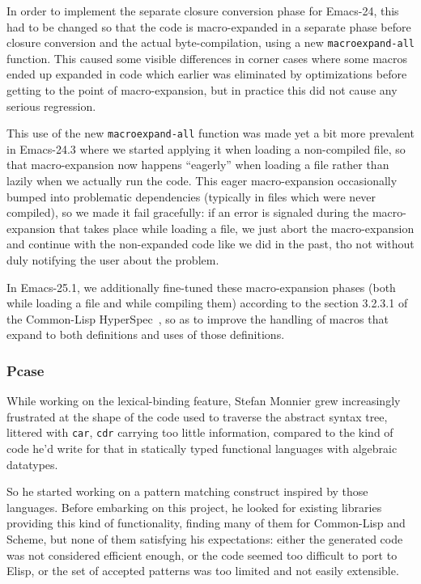 \documentclass[format=acmsmall, review=false, screen=true]{acmart}
\newcommand \Elisp {Elisp}
\begin{document}
In order to implement the separate closure conversion phase for Emacs-24,
this had to be changed so that the code is macro-expanded in a separate
phase before closure conversion and the actual byte-compilation, using a new
\texttt{macroexpand-all} function.
This caused some visible differences in corner cases where some macros ended
up expanded in code which earlier was eliminated by optimizations before
getting to the point of macro-expansion, but in practice this did not cause
any serious regression.

This use of the new \texttt{macroexpand-all} function was made yet a bit
more prevalent in Emacs-24.3 where we started applying it when loading
a non-compiled file, so that macro-expansion now happens ``eagerly'' when
loading a file rather than lazily when we actually run the code.  This eager
macro-expansion occasionally bumped into problematic dependencies (typically
in files which were never compiled), so we made it fail gracefully: if an
error is signaled during the macro-expansion that takes place while loading
a file, we just abort the macro-expansion and continue with the non-expanded
code like we did in the past, tho not without duly notifying the user about
the problem.

In Emacs-25.1, we additionally fine-tuned these macro-expansion phases (both
while loading a file and while compiling them) according to the section
3.2.3.1 of the Common-Lisp HyperSpec~\cite{HyperSpec}, so as to improve the
handling of macros that expand to both definitions and uses of
those definitions.

\subsubsection{Pcase}           %

While working on the lexical-binding feature, Stefan Monnier grew
increasingly frustrated at the shape of the code used to traverse the
abstract syntax tree, littered with \texttt{car}, \texttt{cdr} carrying too
little information, compared to the kind of code he'd write for that in
statically typed functional languages with algebraic datatypes.

So he started working on a pattern matching construct inspired by those
languages.  Before embarking on this project, he looked for existing
libraries providing this kind of functionality, finding many of them for
Common-Lisp and Scheme, but none of them satisfying his expectations: either
the generated code was not considered efficient enough, or the code seemed
too difficult to port to \Elisp{}, or the set of accepted patterns was too
limited and not easily extensible.
\end{document}
